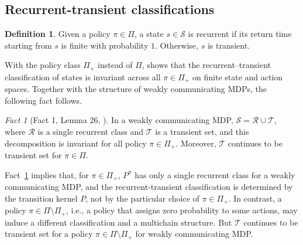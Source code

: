 \documentclass{article}
\theoremstyle{definition}
\newtheorem{definition}[theorem]{Definition}
\theoremstyle{remark}
\newtheorem{fact}{Fact}
\newcommand{\expec}{\mathbb{E}}
\newcommand{\cS}{\mathcal{S}}
\newcommand{\cR}{\mathcal{R}}
\newcommand{\cT}{\mathcal{T}}
\begin{document}
\subsection{Recurrent-transient classifications}
\begin{definition}
Given a policy $\pi\in \Pi$, a state $s\in \cS$ is recurrent if its return time starting from $s$ is finite with probability $1$. Otherwise, $s$ is transient.
\end{definition}
With the policy class $\Pi_+$ instead of $\Pi$, \citep{lee2025policy} shows that  the recurrent--transient classification of states is invariant across all $\pi \in \Pi_+$ on finite state and action spaces. %
Together with the structure of weakly communicating MDPs, the following fact follows. 
\begin{fact}[Fact 1, Lemma 26, \citep{lee2026policy}]\label{fact:rec}
In a weakly communicating MDP, 
$\cS = \cR \cup \cT$, where $\cR$ is a single recurrent class and $\cT$ is a transient set, and this decomposition is invariant for all policy $\pi \in \Pi_+$. Moreover, $\cT$ continues to be transient set  for $\pi \in \Pi$. 
\end{fact}

Fact~\ref{fact:rec} implies that, for $\pi\in \Pi_+$, $P^\pi$ has only a single recurrent class for a weakly communicating MDP, and the recurrent-transient classification is determined by the transition kernel $P$, not by the particular choice of $\pi\in \Pi_+$. In contrast, a policy $\pi\in \Pi\setminus\Pi_+$, i.e., a policy that assigns zero probability to some actions, may induce a different classification and a multichain structure. But $\cT$ continues to be transient set for a policy $\pi\in \Pi\setminus\Pi_+$ for weakly communicating MDP.
\end{document}
